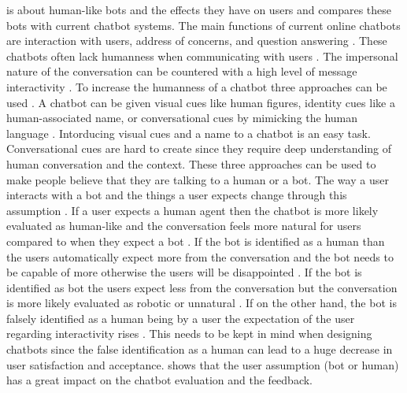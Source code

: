\citet{GO2019304} is about human-like bots and the 
effects they have on users and compares these bots with current chatbot systems.
The main functions of current online chatbots are interaction with users, address of concerns, and question answering \cite{GO2019304}.
These chatbots often lack humanness when communicating with users \cite{GO2019304}.
The impersonal nature of the conversation can be countered with a high level of message interactivity \cite{GO2019304}.
To increase the humanness of a chatbot three approaches can be used \cite{GO2019304}.
A chatbot can be given visual cues like human figures, identity cues like a human-associated name, or 
conversational cues by mimicking the human language \cite{GO2019304}.
Intorducing visual cues and a name to a chatbot is an easy task.
Conversational cues are hard to create since they require deep
understanding of human conversation and the context.
These three approaches can be used to make people believe that they are talking to a human or a bot.
The way a user interacts with a bot and the things a user expects change through this assumption \cite{sundar2016theoretical, GO2019304}.
If a user expects a human agent then the chatbot is more likely evaluated as human-like and the conversation 
feels more natural for users compared to when they expect a bot \cite{sundar2016theoretical}.
If the bot is identified as a human than the users automatically expect more from the conversation and the 
bot needs to be capable of more otherwise the users will be disappointed \cite{GO2019304}.
If the bot is identified as bot the users expect less from the conversation but the conversation 
is more likely evaluated as robotic or unnatural \cite{GO2019304}.
If on the other hand, the bot is falsely identified as a human being by a user the expectation of the user regarding 
interactivity rises \cite{GO2019304}.
This needs to be kept in mind when designing chatbots since the false identification as a human 
can lead to a huge decrease in user satisfaction and acceptance.
\citet{GO2019304} shows that the user assumption (bot or human) has a great impact 
on the chatbot evaluation and the feedback.


